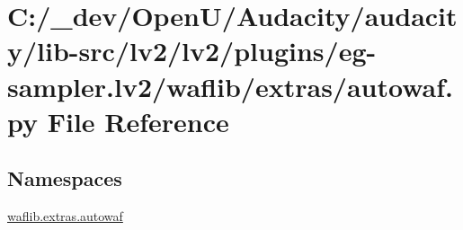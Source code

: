 \hypertarget{lv2_2plugins_2eg-sampler_8lv2_2waflib_2extras_2autowaf_8py}{}\section{C\+:/\+\_\+dev/\+Open\+U/\+Audacity/audacity/lib-\/src/lv2/lv2/plugins/eg-\/sampler.lv2/waflib/extras/autowaf.py File Reference}
\label{lv2_2plugins_2eg-sampler_8lv2_2waflib_2extras_2autowaf_8py}
\subsection*{Namespaces}
\begin{DoxyCompactItemize}
\item 
 \hyperlink{namespacewaflib_1_1extras_1_1autowaf}{waflib.\+extras.\+autowaf}
\end{DoxyCompactItemize}
